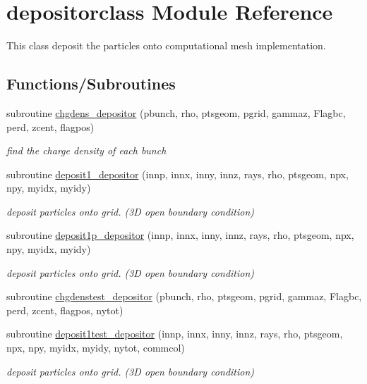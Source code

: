 \hypertarget{namespacedepositorclass}{}\section{depositorclass Module Reference}
\label{namespacedepositorclass}


This class deposit the particles onto computational mesh implementation.  


\subsection*{Functions/\+Subroutines}
\begin{DoxyCompactItemize}
\item 
subroutine \mbox{\hyperlink{namespacedepositorclass_adea4a5f5ed3c85a2ef236eaa94f10b98}{chgdens\+\_\+depositor}} (pbunch, rho, ptsgeom, pgrid, gammaz, Flagbc, perd, zcent, flagpos)
\begin{DoxyCompactList}\small\item\em find the charge density of each bunch \end{DoxyCompactList}\item 
subroutine \mbox{\hyperlink{namespacedepositorclass_acb64300f2b31d40a2d4741c4475ae10a}{deposit1\+\_\+depositor}} (innp, innx, inny, innz, rays, rho, ptsgeom, npx, npy, myidx, myidy)
\begin{DoxyCompactList}\small\item\em deposit particles onto grid. (3D open boundary condition) \end{DoxyCompactList}\item 
subroutine \mbox{\hyperlink{namespacedepositorclass_a1f57e8a4537070af145a196172e3ba85}{deposit1p\+\_\+depositor}} (innp, innx, inny, innz, rays, rho, ptsgeom, npx, npy, myidx, myidy)
\begin{DoxyCompactList}\small\item\em deposit particles onto grid. (3D open boundary condition) \end{DoxyCompactList}\item 
subroutine \mbox{\hyperlink{namespacedepositorclass_a258e6305ffaed5752f7eaa0584e2e6d8}{chgdenstest\+\_\+depositor}} (pbunch, rho, ptsgeom, pgrid, gammaz, Flagbc, perd, zcent, flagpos, nytot)
\item 
subroutine \mbox{\hyperlink{namespacedepositorclass_aaa31c3a30e6e83ab67ee89344612328c}{deposit1test\+\_\+depositor}} (innp, innx, inny, innz, rays, rho, ptsgeom, npx, npy, myidx, myidy, nytot, commcol)
\begin{DoxyCompactList}\small\item\em deposit particles onto grid. (3D open boundary condition) \end{DoxyCompactList}\end{DoxyCompactItemize}


